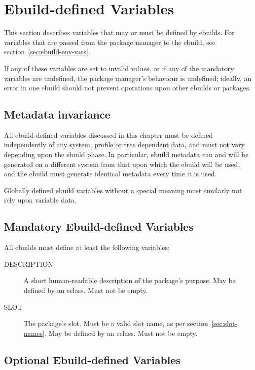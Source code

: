 \chapter{Ebuild-defined Variables}
\label{sec:ebuild-vars}

\note This section describes variables that may or must be defined by ebuilds. For
variables that are passed from the package manager to the ebuild, see section~\ref{sec:ebuild-env-vars}.

If any of these variables are set to invalid values, or if any of the mandatory variables are
undefined, the package manager's behaviour is undefined; ideally, an error in one ebuild should not
prevent operations upon other ebuilds or packages.

\section{Metadata invariance}
\label{sec:metadata-invariance}

All ebuild-defined variables discussed in this chapter must be defined independently of
any system, profile or tree dependent data, and must not vary depending upon the ebuild
phase. In particular, ebuild metadata can and will be generated on a different system from that upon
which the ebuild will be used, and the ebuild must generate identical metadata every time it
is used.

Globally defined ebuild variables without a special meaning must similarly not rely upon
variable data.

\section{Mandatory Ebuild-defined Variables}

All ebuilds must define at least the following variables:

\begin{description}
\item[DESCRIPTION] A short human-readable description of the package's purpose. May be defined by an
    eclass. Must not be empty.
\item[SLOT] The package's slot. Must be a valid slot name, as per section~\ref{sec:slot-names}.
    May be defined by an eclass. Must not be empty.
\end{description}

\section{Optional Ebuild-defined Variables}

